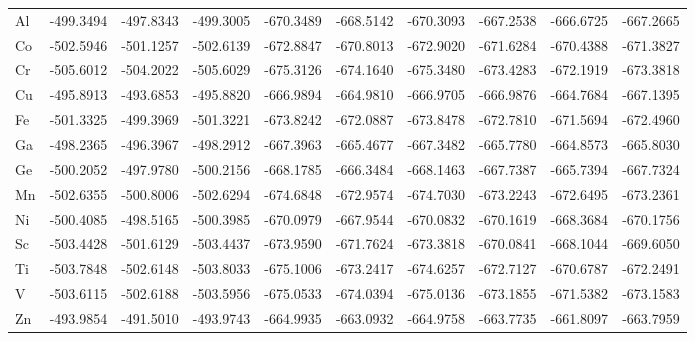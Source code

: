 \begin{table}[h]
  \centering
  {\fontsize{6}{12}\selectfont
  \begin{tabular}{*{10}{l}}
      Al & -499.3494 & -497.8343 & -499.3005 & -670.3489 & -668.5142 & -670.3093 & -667.2538 & -666.6725 & -667.2665 \\
      Co & -502.5946 & -501.1257 & -502.6139 & -672.8847 & -670.8013 & -672.9020 & -671.6284 & -670.4388 & -671.3827 \\
      Cr & -505.6012 & -504.2022 & -505.6029 & -675.3126 & -674.1640 & -675.3480 & -673.4283 & -672.1919 & -673.3818 \\
      Cu & -495.8913 & -493.6853 & -495.8820 & -666.9894 & -664.9810 & -666.9705 & -666.9876 & -664.7684 & -667.1395 \\
      Fe & -501.3325 & -499.3969 & -501.3221 & -673.8242 & -672.0887 & -673.8478 & -672.7810 & -671.5694 & -672.4960 \\
      Ga & -498.2365 & -496.3967 & -498.2912 & -667.3963 & -665.4677 & -667.3482 & -665.7780 & -664.8573 & -665.8030 \\
      Ge & -500.2052 & -497.9780 & -500.2156 & -668.1785 & -666.3484 & -668.1463 & -667.7387 & -665.7394 & -667.7324 \\
      Mn & -502.6355 & -500.8006 & -502.6294 & -674.6848 & -672.9574 & -674.7030 & -673.2243 & -672.6495 & -673.2361 \\
      Ni & -500.4085 & -498.5165 & -500.3985 & -670.0979 & -667.9544 & -670.0832 & -670.1619 & -668.3684 & -670.1756 \\
      Sc & -503.4428 & -501.6129 & -503.4437 & -673.9590 & -671.7624 & -673.3818 & -670.0841 & -668.1044 & -669.6050 \\
      Ti & -503.7848 & -502.6148 & -503.8033 & -675.1006 & -673.2417 & -674.6257 & -672.7127 & -670.6787 & -672.2491 \\
      V  & -503.6115 & -502.6188 & -503.5956 & -675.0533 & -674.0394 & -675.0136 & -673.1855 & -671.5382 & -673.1583 \\
      Zn & -493.9854 & -491.5010 & -493.9743 & -664.9935 & -663.0932 & -664.9758 & -663.7735 & -661.8097 & -663.7959 \\

\end{tabular}}
\end{table}
